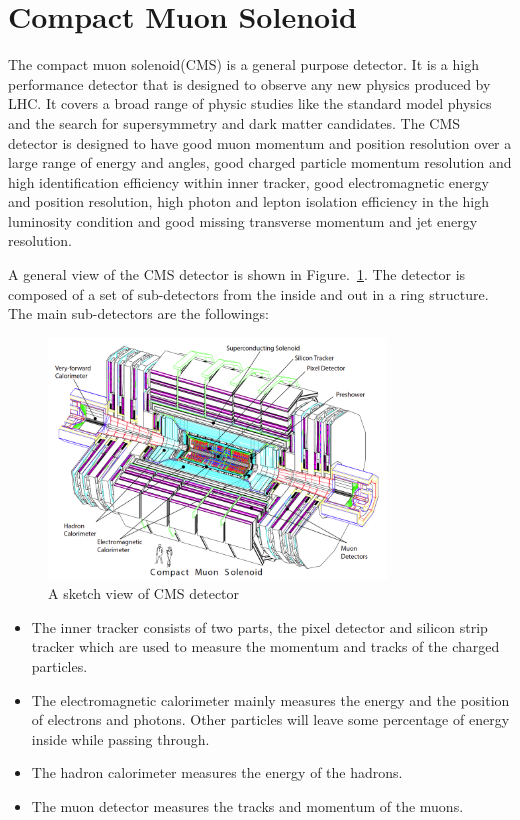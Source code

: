\section{Compact Muon Solenoid}
The compact muon solenoid(CMS) is a general purpose detector. It is a high performance detector that is designed to observe any new physics produced by LHC. It covers a broad range of physic studies like the standard model physics and the search for supersymmetry and dark matter candidates. The CMS detector is designed to have good muon momentum and position resolution over a large range of energy and angles, good charged particle momentum resolution and high identification efficiency within inner tracker, good electromagnetic energy and position resolution, high photon and lepton isolation efficiency in the high luminosity condition and good missing transverse momentum and jet energy resolution.  


A general view of the CMS detector is shown in Figure.~\ref{fig:CMS_sketch}. The detector is composed of a set of sub-detectors from the inside and out in a ring structure. The main sub-detectors are the followings:

\begin{figure}[htbp] 
\centering
\includegraphics[width=0.8\textwidth]{chapter3/CMS_detecter.png}
\caption[A sketch view of CMS detector]{A sketch view of CMS detector~\cite{CMS_experiment}}
\label{fig:CMS_sketch}
\end{figure}


\begin{itemize}
\item The inner tracker consists of two parts, the pixel detector and silicon strip tracker which are used to measure the momentum and tracks of the charged particles.
\item The electromagnetic calorimeter mainly measures the energy and the position of electrons and photons. Other particles will leave some percentage of energy inside while passing through.
\item The hadron calorimeter measures the energy of the hadrons. 
\item The muon detector measures the tracks and momentum of the muons.
\end{itemize} 


